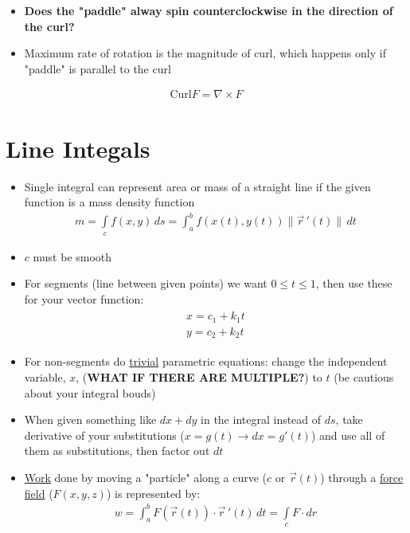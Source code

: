 \documentclass{article}
\begin{document}
\begin{itemize}
\begin{itemize}
    \item \textbf{Does the "paddle" alway spin counterclockwise in the direction of the curl?}
    \item Maximum rate of rotation is the magnitude of curl, which happens only if "paddle" is parallel to the curl
  \end{itemize}
  \begin{align}
    \textrm{Curl}F = \nabla\times F
  \end{align}
\end{itemize}


\section{Line Integals}
\begin{itemize}
  \item Single integral can represent area or mass of a straight line if the given function is a mass density function
    \begin{align}
      m = \int\limits_c f(x,y) \, ds = \int_{a}^{b} f(x(t), y(t))\|\vec{r}\,'(t)\|\, dt
    \end{align}
  \item $c$ must be smooth
  \item For segments (line between given points) we want $0 \leq t \leq 1$, then use these for your vector function:
  \begin{align}
    \begin{split}
      x = c_1 +k_1t \\
      y = c_2 +k_2t
    \end{split}
  \end{align}
\item For non-segments do \underline{trivial} parametric equations: change the independent variable, $x$, (\textbf{WHAT IF THERE ARE MULTIPLE?}) to $t$ (be cautious about your integral bouds)
  \item When given something like $dx + dy$ in the integral instead of $ds$, take derivative of your substitutions ($x = g(t) \rightarrow dx = g'(t)$) and use all of them as substitutions, then factor out $dt$
\item \underline{Work} done by moving a "particle" along a curve ($c$ or $\vec{r}(t)$) through a \underline{force field} ($F(x,y,z)$) is represented by:
  \begin{align}
    w = \int_{a}^{b} F(\vec{r}(t))\cdot\vec{r}\,'(t) \, dt = \int\limits_c F\cdot dr
  \end{align}
\end{itemize}
\end{document}

